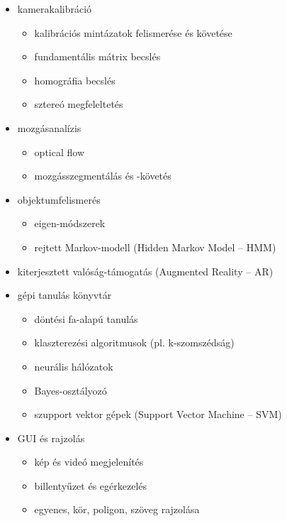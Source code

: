 \begin{itemize}
 \item kamerakalibráció
  \begin{itemize}
   \item kalibrációs mintázatok felismerése és követése
   \item fundamentális mátrix becslés
   \item homográfia becslés
   \item sztereó megfeleltetés
  \end{itemize}
  
 \item mozgásanalízis
  \begin{itemize}
   \item optical flow
   \item mozgásszegmentálás és -követés
  \end{itemize}

 \item objektumfelismerés
  \begin{itemize}
   \item eigen-módszerek
   \item rejtett Markov-modell (Hidden Markov Model -- HMM)
  \end{itemize}
  
  \item kiterjesztett valóság-támogatás (Augmented Reality -- AR)
  
  \item gépi tanulás könyvtár
  \begin{itemize}
    \item döntési fa-alapú tanulás
    \item klaszterezési algoritmusok (pl. k-szomszédság)
    \item neurális hálózatok
    \item Bayes-osztályozó
    \item szupport vektor gépek (Support Vector Machine -- SVM)
  \end{itemize}    
  
 \item GUI és rajzolás
  \begin{itemize}
   \item kép és videó megjelenítés
   \item billentyűzet és egérkezelés
   \item egyenes, kör, poligon, szöveg rajzolása
  \end{itemize}
  
\end{itemize}

